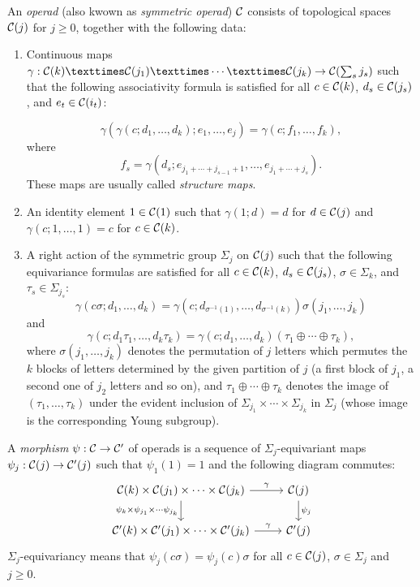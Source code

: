 \documentclass[TFM.tex]{subfiles}
\begin{document}
\begin{defi}\label{operadtop}
An \emph{operad} (also kwown as \emph{symmetric operad}) $\mathcal{C}$ consists of topological spaces $\mathcal{C}(j)$ for $j\geq 0$, %
together with the following data:
\begin{enumerate}[(1)]
\item Continuous maps $\gamma : \CC(k) × \CC(j_1) × \cdots × \CC(j_k) \to \CC(\sum_s j_s)$ such that the
following associativity formula is satisfied for all $c\in \mathcal{C}(k)$, $d_s \in \mathcal{C}(j_s)$, and $e_t \in \mathcal{C}(i_t)$:

\[\gamma(
\gamma(c; d_1, \dots , d_k); e_1, \dots , e_j) = 
\gamma(c; f_1, \dots , f_k),
\]
where $$f_s = \gamma(d_s; e_{j_1+\cdots+j_{s−1}+1}, \dots , e_{j_1+\cdots+j_s} ).$$%
These maps are usually called \emph{structure maps}.

\item An identity element $1 \in \mathcal{C}(1)$ such that 
$\gamma(1; d) = d$ for $d \in \mathcal{C}(j)$ and 
$\gamma(c; 1,\dots,1) = c$ for
$c \in \mathcal{C}(k)$.

\item A right action of the symmetric group $\Sigma_j$ on $\mathcal{C}(j)$ such that the following equivariance
formulas are satisfied for all $c\in \mathcal{C}(k)$, $d_s \in \mathcal{C}(j_s)$, $\sigma\in\Sigma_k$, and $\tau_s\in\Sigma_{j_s}$:
\[
\gamma(c\sigma; d_1, \dots , d_k) = 
\gamma(c; d_{\sigma^{−1}(1)}, \dots , d_{\sigma^{−1}(k)})\sigma(j_1, \dots , j_k)
\]
and 
\[
\gamma(c; d_1\tau_1, \dots , d_k\tau_k) = \gamma(c; d_1, \dots , d_k)(\tau_1\oplus\cdots\oplus\tau_k),
\] 
where $\sigma(j_1, \dots , j_k)$ denotes the
permutation of $j$ letters which permutes the $k$ blocks of letters determined by the given
partition of $j$ (a first block of $j_1$, a second one of $j_2$ letters and so on), and $\tau_1\oplus\cdots\oplus\tau_k$ denotes the image of $(\tau_1, \dots , \tau_k)$ under the evident inclusion of $\Sigma_{j_1} × \cdots × \Sigma_{j_k}$ in $\Sigma_j$ (whose image is the corresponding Young subgroup).
\end{enumerate}
\end{defi}



\begin{defi}
A \emph{morphism} $\psi:\mathcal{C} \to \mathcal{C}'$ of operads is a sequence of $\Sigma_j$-equivariant maps  $\psi_j : \mathcal{C}(j)\to \mathcal{C}'(j)$ such that
 $\psi_1(1) = 1$ and the following diagram commutes:
 \[
 \begin{tikzcd}
\CC(k)\times \CC(j_1)\times\cdots\times \CC(j_k) \arrow[r, "\gamma"] \arrow[d, "\psi_k\times\psi_{j_1}\times\cdots\psi_{j_k}"'] & \CC(j) \arrow[d, "\psi_j"] \\
\CC'(k)\times \CC'(j_1)\times\cdots\times \CC'(j_k) \arrow[r, "\gamma"]                                                         & \CC'(j)                   
\end{tikzcd}\]
$\Sigma_j$-equivariancy means that $\psi_j(c\sigma)=\psi_j(c)\sigma$ for all $c\in \mathcal{C}(j)$, $\sigma\in\Sigma_j$ and $j\geq 0$. 
\end{defi}
\end{document}
